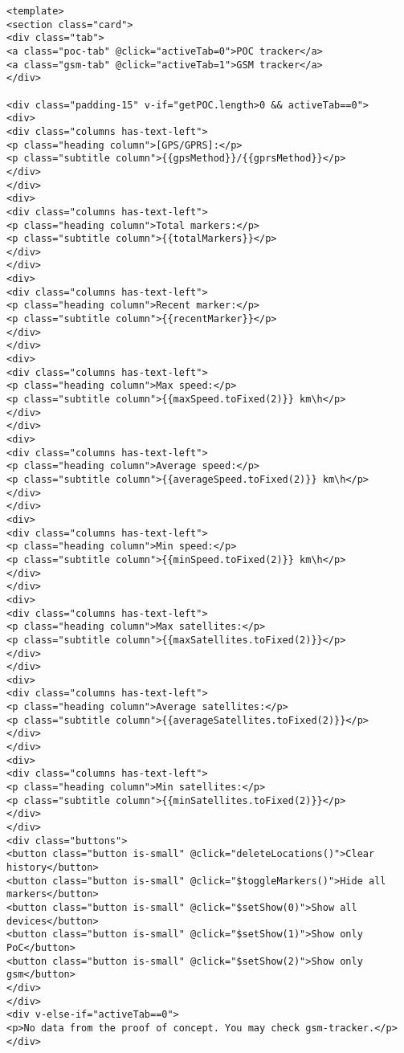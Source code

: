 \begin{verbatim}
<template>
<section class="card">
<div class="tab">
<a class="poc-tab" @click="activeTab=0">POC tracker</a>
<a class="gsm-tab" @click="activeTab=1">GSM tracker</a>
</div>

<div class="padding-15" v-if="getPOC.length>0 && activeTab==0">
<div>
<div class="columns has-text-left">
<p class="heading column">[GPS/GPRS]:</p>
<p class="subtitle column">{{gpsMethod}}/{{gprsMethod}}</p>
</div>
</div>
<div>
<div class="columns has-text-left">
<p class="heading column">Total markers:</p>
<p class="subtitle column">{{totalMarkers}}</p>
</div>
</div>
<div>
<div class="columns has-text-left">
<p class="heading column">Recent marker:</p>
<p class="subtitle column">{{recentMarker}}</p>
</div>
</div>
<div>
<div class="columns has-text-left">
<p class="heading column">Max speed:</p>
<p class="subtitle column">{{maxSpeed.toFixed(2)}} km\h</p>
</div>
</div>
<div>
<div class="columns has-text-left">
<p class="heading column">Average speed:</p>
<p class="subtitle column">{{averageSpeed.toFixed(2)}} km\h</p>
</div>
</div>
<div>
<div class="columns has-text-left">
<p class="heading column">Min speed:</p>
<p class="subtitle column">{{minSpeed.toFixed(2)}} km\h</p>
</div>
</div>
<div>
<div class="columns has-text-left">
<p class="heading column">Max satellites:</p>
<p class="subtitle column">{{maxSatellites.toFixed(2)}}</p>
</div>
</div>
<div>
<div class="columns has-text-left">
<p class="heading column">Average satellites:</p>
<p class="subtitle column">{{averageSatellites.toFixed(2)}}</p>
</div>
</div>
<div>
<div class="columns has-text-left">
<p class="heading column">Min satellites:</p>
<p class="subtitle column">{{minSatellites.toFixed(2)}}</p>
</div>
</div>
<div class="buttons">
<button class="button is-small" @click="deleteLocations()">Clear history</button>
<button class="button is-small" @click="$toggleMarkers()">Hide all markers</button>
<button class="button is-small" @click="$setShow(0)">Show all devices</button>
<button class="button is-small" @click="$setShow(1)">Show only PoC</button>
<button class="button is-small" @click="$setShow(2)">Show only gsm</button>
</div>
</div>
<div v-else-if="activeTab==0">
<p>No data from the proof of concept. You may check gsm-tracker.</p>
</div>


\end{verbatim}
